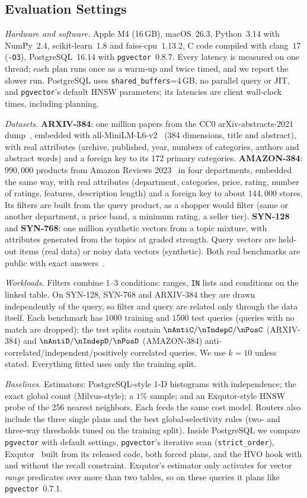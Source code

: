 \subsection{Evaluation Settings}\label{sec:setup}
\emph{Hardware and software.} Apple M4 (16\,GB), macOS~26.3, Python~3.14 with NumPy~2.4, scikit-learn~1.8 and faiss-cpu~1.13.2, C code compiled with clang~17 (\texttt{-O3}), PostgreSQL~16.14 with \texttt{pgvector}~0.8.7. Every latency is measured on one thread; each plan runs once as a warm-up and twice timed, and we report the slower run. PostgreSQL uses \texttt{shared\_buffers}=4\,GB, no parallel query or JIT, and \texttt{pgvector}'s default HNSW parameters; its latencies are client wall-clock times, including planning.

\emph{Datasets.} \textbf{ARXIV-384}: one million papers from the CC0 arXiv-abstracts-2021 dump~\cite{arxivdump}, embedded with all-MiniLM-L6-v2~\cite{reimers2019sbert} (384 dimensions, title and abstract), with real attributes (archive, published, year, numbers of categories, authors and abstract words) and a foreign key to its 172 primary categories. \textbf{AMAZON-384}: $990{,}000$ products from Amazon Reviews 2023~\cite{hou2024amazon} in four departments, embedded the same way, with real attributes (department, categories, price, rating, number of ratings, features, description length) and a foreign key to about $144{,}000$ stores. Its filters are built from the query product, as a shopper would filter (same or another department, a price band, a minimum rating, a seller tier). \textbf{SYN-128} and \textbf{SYN-768}: one million synthetic vectors from a topic mixture, with attributes generated from the topics at graded strength. Query vectors are held-out items (real data) or noisy data vectors (synthetic). Both real benchmarks are public with exact answers~\cite{hvobench}.

\emph{Workloads.} Filters combine 1--3 conditions: ranges, \texttt{IN} lists and conditions on the linked table. On SYN-128, SYN-768 and ARXIV-384 they are drawn independently of the query, so filter and query are related only through the data itself. Each benchmark has $1000$ training and $1500$ test queries (queries with no match are dropped); the test splits contain $\nAntiC/\nIndepC/\nPosC$ (ARXIV-384) and $\nAntiD/\nIndepD/\nPosD$ (AMAZON-384) anti-correlated/independent/positively correlated queries. We use $k=10$ unless stated. Everything fitted uses only the training split.

\emph{Baselines.} Estimators: PostgreSQL-style 1-D histograms with independence; the exact global count (Milvus-style); a $1\%$ sample; and an Exqutor-style HNSW probe of the 256 nearest neighbors. Each feeds the same cost model. Routers also include the three single plans and the best global-selectivity rules (two- and three-way thresholds tuned on the training split). Inside PostgreSQL we compare \texttt{pgvector} with default settings, \texttt{pgvector}'s iterative scan (\texttt{strict\_order}), Exqutor~\cite{exqutor2026} built from its released code, both forced plans, and the HVO hook with and without the recall constraint. Exqutor's estimator only activates for vector \emph{range} predicates over more than two tables, so on these queries it plans like \texttt{pgvector}~0.7.1.

